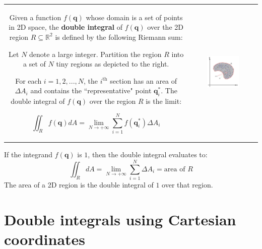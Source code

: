 \documentclass{article}
\begin{document}
\begin{tabular}{cc}
\parbox{0.5\textwidth}{  
Given a function \(f(\mathbf{q})\) whose domain is a set of points in 2D space, the {\bf double integral} of \(f(\mathbf{q})\) over the 2D region \(R \subseteq \mathbb{R}^2\) is defined by the following Riemann sum: 

Let \(N\) denote a large integer. Partition the region \(R\) into a set of \(N\) tiny regions as depicted to the right. 

For each \(i = 1, 2, ..., N\), the \(i^{\text{th}}\) section has an area of \(\Delta A_i\) and contains the ``representative" point \(\mathbf{q}_i^*\). The double integral of \(f(\mathbf{q})\) over the region \(R\) is the limit:

\[\iint_{R} f(\mathbf{q})dA = \lim_{N \rightarrow +\infty} \sum_{i=1}^N f(\mathbf{q}_i^*)\Delta A_i\] 

} & \parbox{0.5\textwidth}{
\includegraphics[width = 0.5\textwidth]{double_integral_riemann_sum}
}
\end{tabular}

If the integrand \(f(\mathbf{q})\) is \(1\), then the double integral evaluates to:
\[\iint_{R} dA = \lim_{N \rightarrow +\infty} \sum_{i=1}^N \Delta A_i = \text{area of \(R\)}\]
The area of a 2D region is the double integral of \(1\) over that region.


\section*{Double integrals using Cartesian coordinates}

~
\end{document}
